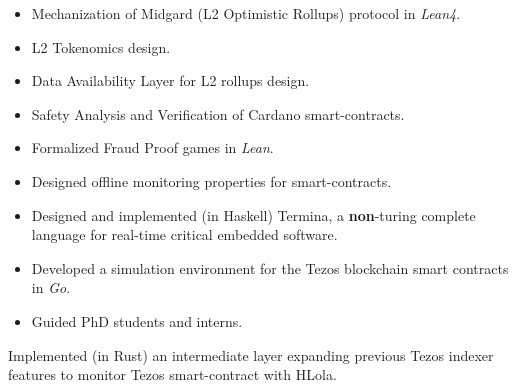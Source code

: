 
    \begin{itemize}
      \item Mechanization of Midgard (L2 Optimistic Rollups) protocol in \emph{Lean4}.
      \item L2 Tokenomics design.
      \item Data Availability Layer for L2 rollups design.
      \item Safety Analysis and Verification of Cardano smart-contracts.
    \end{itemize}
    \divider
    \begin{itemize}
        \item Formalized Fraud Proof games in \emph{Lean}.
        \item Designed offline monitoring properties for smart-contracts.
        \item Designed and implemented (in Haskell) Termina, a
            \textbf{non}-turing complete language for real-time critical embedded software.
        \item Developed a simulation environment for the Tezos blockchain smart contracts in \emph{Go}.
        \item Guided PhD students and interns.
    \end{itemize}

    \divider

        Implemented (in Rust) an intermediate layer expanding previous
            Tezos indexer features to monitor Tezos smart-contract with HLola.

